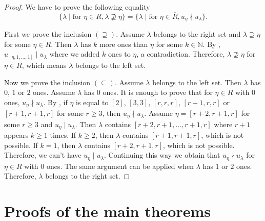 \documentclass[a4paper, 12pt, reqno]{amsart}
\theoremstyle{remark}
\begin{document}
\begin{proof}
  We have to prove the following equality
  \begin{equation*}
    \{\lambda \mid \text{for }\eta \in R, \lambda \nsupseteq \eta\} = \{\lambda \mid \text{for }\eta \in \overline{R}, u_{\eta} \nmid u_{\lambda}\}.
  \end{equation*}

  First we prove the inclusion $(\supseteq)$.
  Assume $\lambda$ belongs to the right set and $\lambda \supseteq \eta$ for some $\eta \in R$.
  Then $\lambda$ has $k$ more ones than $\eta$ for some $k \in \mathbb{N}$.
  By , $u_{[\eta, 1, \dots, 1]} \mid u_{\lambda}$ where we added $k$ ones to $\eta$, a contradiction.
  Therefore, $\lambda \nsupseteq \eta$ for $\eta \in R$, which means $\lambda$ belongs to the left set.

  Now we prove the inclusion $(\subseteq)$.
  Assume $\lambda$ belongs to the left set.
  Then $\lambda$ has $0$, $1$ or $2$ ones.
  Assume $\lambda$ has $0$ ones.
  It is enough to prove that for $\eta \in R$ with $0$ ones, $u_{\eta} \nmid u_{\lambda}$.
  By , if $\eta$ is equal to $[2]$, $[3, 3]$, $[r, r, r]$, $[r + 1, r, r]$ or $[r + 1, r + 1, r]$ for some $r \ge 3$, then $u_{\eta} \nmid u_{\lambda}$.
  Assume $\eta = [r + 2, r + 1, r]$ for some $r \ge 3$ and $u_{\eta} \mid u_{\lambda}$.
  Then $\lambda$ contains $[r + 2, r + 1, \dots, r + 1, r]$ where $r + 1$ appears $k \ge 1$ times.
  If $k \ge 2$, then $\lambda$ contains $[r + 1, r + 1, r]$, which is not possible.
  If $k = 1$, then $\lambda$ contains $[r + 2, r + 1, r]$, which is not possible.
  Therefore, we can't have $u_{\eta} \mid u_{\lambda}$.
  Continuing this way we obtain that $u_{\eta} \nmid u_{\lambda}$ for $\eta \in R$ with $0$ ones.
  The same argument can be applied when $\lambda$ has $1$ or $2$ ones.
  Therefore, $\lambda$ belongs to the right set.
\end{proof}

\section{Proofs of the main theorems}
\label{sec:proofs-main-theorems}
\end{document}
